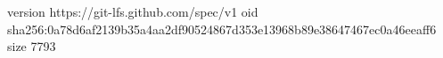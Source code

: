 version https://git-lfs.github.com/spec/v1
oid sha256:0a78d6af2139b35a4aa2df90524867d353e13968b89e38647467ec0a46eeaff6
size 7793
